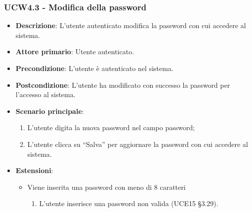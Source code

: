 \subsubsection{UCW4.3 - Modifica della password}
\begin{itemize}
\item \textbf{Descrizione}: L'utente autenticato modifica la password con cui accedere al sistema.
\item \textbf{Attore primario}: Utente autenticato.
\item \textbf{Precondizione}: L’utente è autenticato nel sistema.
\item \textbf{Postcondizione}: L’utente ha modificato con successo la password per l’accesso al sistema.

\item \textbf{Scenario principale}:
\begin{enumerate}
\item L’utente digita la nuova password nel campo password;
\item L’utente clicca su “Salva” per aggiornare la password con cui accedere al sistema.
\end{enumerate}

\item \textbf{Estensioni}:
\begin{itemize}
\item Viene inserita una password con meno di 8 caratteri
\begin{enumerate}
	\item L'utente inserisce una password non valida (UCE15 §3.29).
\end{enumerate}
\end{itemize}
\end{itemize}

\pagebreak